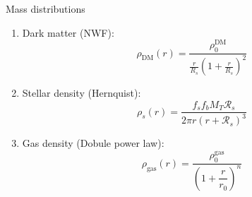 \documentclass{beamer}
\newcommand{\sm}[0]{$M_\odot$}
\begin{document}
\begin{frame}{Mass distributions}
	\begin{enumerate}
		\item Dark matter (NWF):
		\begin{equation}\label{eq: dmdensity}
		\rho_\text{DM}(r) = \dfrac{\rho_0^\text{DM}}{\frac{r}{R_s}\left(1 + \frac{r}{R_s}\right)^2}
		\end{equation}
		\item Stellar density (Hernquist):
		\begin{equation}
		\rho_s(r) = \dfrac{f_sf_bM_T \mathcal{R}_s}{2\pi r(r + \mathcal{R}_s)^3}
		\end{equation}
		\item Gas density (Dobule power law):
		\begin{equation}\label{eq: rdensity}
		\rho_\text{gas}(r) = \dfrac{\rho_0^\text{gas}}{\left(1 + \dfrac{r}{r_0}\right)^n}
		\end{equation}
	\end{enumerate}
\end{frame}

\end{document}
